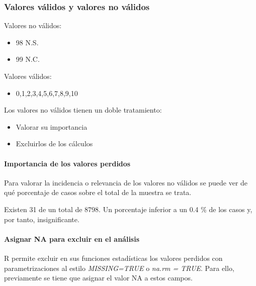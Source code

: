 \documentclass[
  12 pt,
  a4paper,
]{article}
\providecommand{\tightlist}{%
  \setlength{\itemsep}{0pt}\setlength{\parskip}{0pt}}
\begin{document}
\hypertarget{valores-vuxe1lidos-y-valores-no-vuxe1lidos}{%
\subsubsection{Valores válidos y valores no
válidos}\label{valores-vuxe1lidos-y-valores-no-vuxe1lidos}}

Valores no válidos:

\begin{itemize}
\tightlist
\item
  98 N.S.
\item
  99 N.C.
\end{itemize}

Valores válidos:

\begin{itemize}
\tightlist
\item
  0,1,2,3,4,5,6,7,8,9,10
\end{itemize}

Los valores no válidos tienen un doble tratamiento:

\begin{itemize}
\tightlist
\item
  Valorar su importancia
\item
  Excluirlos de los cálculos
\end{itemize}

\hypertarget{importancia-de-los-valores-perdidos}{%
\paragraph{Importancia de los valores
perdidos}\label{importancia-de-los-valores-perdidos}}

Para valorar la incidencia o relevancia de los valores no válidos se
puede ver de qué porcentaje de casos sobre el total de la muestra se
trata.

Existen 31 de un total de 8798. Un porcentaje inferior a un 0.4 \% de
los casos y, por tanto, insignificante.

\hypertarget{asignar-na-para-excluir-en-el-anuxe1lisis}{%
\paragraph{Asignar NA para excluir en el
análisis}\label{asignar-na-para-excluir-en-el-anuxe1lisis}}

R permite excluir en sus funciones estadísticas los valores perdidos con
parametrizaciones al estilo \emph{MISSING=TRUE} o \emph{na.rm = TRUE}.
Para ello, previamente se tiene que asignar el valor NA a estos campos.
\end{document}
